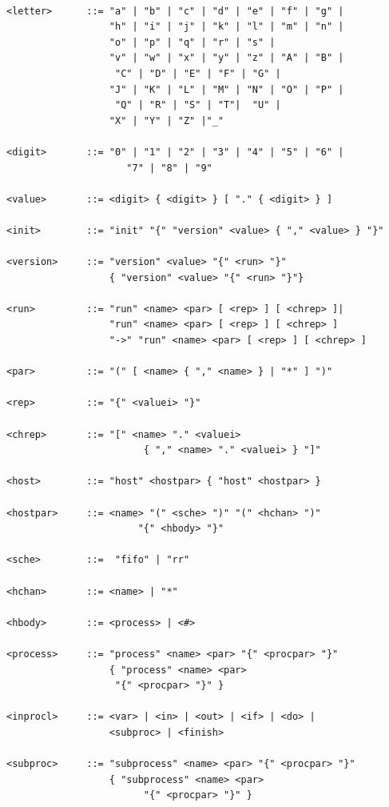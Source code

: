 \begin{verbatim}

<letter>      ::= "a" | "b" | "c" | "d" | "e" | "f" | "g" | 
                  "h" | "i" | "j" | "k" | "l" | "m" | "n" |
                  "o" | "p" | "q" | "r" | "s" |
                  "v" | "w" | "x" | "y" | "z" | "A" | "B" |
                   "C" | "D" | "E" | "F" | "G" |
                  "J" | "K" | "L" | "M" | "N" | "O" | "P" |
                   "Q" | "R" | "S" | "T"|  "U" |
                  "X" | "Y" | "Z" |"_"

<digit>       ::= "0" | "1" | "2" | "3" | "4" | "5" | "6" |
                     "7" | "8" | "9"

<value>       ::= <digit> { <digit> } [ "." { <digit> } ]

<init>        ::= "init" "{" "version" <value> { "," <value> } "}" 

<version>     ::= "version" <value> "{" <run> "}"
                  { "version" <value> "{" <run> "}"}

<run>         ::= "run" <name> <par> [ <rep> ] [ <chrep> ]| 
                  "run" <name> <par> [ <rep> ] [ <chrep> ]
                  "->" "run" <name> <par> [ <rep> ] [ <chrep> ]

<par>         ::= "(" [ <name> { "," <name> } | "*" ] ")"
		
<rep>         ::= "{" <valuei> "}"

<chrep>       ::= "[" <name> "." <valuei> 
                        { "," <name> "." <valuei> } "]"
		
<host>        ::= "host" <hostpar> { "host" <hostpar> }

<hostpar>     ::= <name> "(" <sche> ")" "(" <hchan> ")"
                       "{" <hbody> "}"

<sche>        ::=  "fifo" | "rr"

<hchan>       ::= <name> | "*" 

<hbody>       ::= <process> | <#>

<process>     ::= "process" <name> <par> "{" <procpar> "}" 
                  { "process" <name> <par>
                   "{" <procpar> "}" }

<inprocl>     ::= <var> | <in> | <out> | <if> | <do> |
                  <subproc> | <finish>

<subproc>     ::= "subprocess" <name> <par> "{" <procpar> "}" 
                  { "subprocess" <name> <par> 
                        "{" <procpar> "}" }
\end{verbatim}


